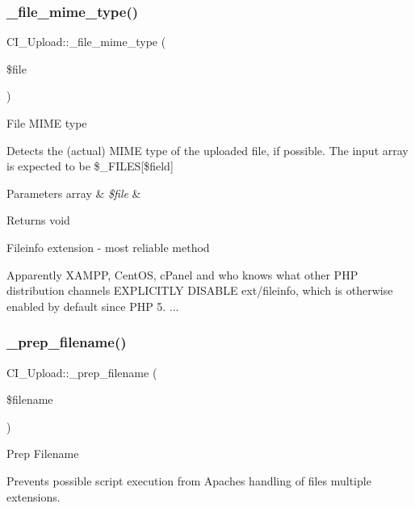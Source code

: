 \subsubsection{\texorpdfstring{\+\_\+file\+\_\+mime\+\_\+type()}{\_file\_mime\_type()}}
{\footnotesize\ttfamily C\+I\+\_\+\+Upload\+::\+\_\+file\+\_\+mime\+\_\+type (\begin{DoxyParamCaption}\item[{}]{\$file }\end{DoxyParamCaption})\hspace{0.3cm}{\ttfamily [protected]}}

File M\+I\+ME type

Detects the (actual) M\+I\+ME type of the uploaded file, if possible. The input array is expected to be \$\+\_\+\+F\+I\+L\+ES\mbox{[}\$field\mbox{]}


\begin{DoxyParams}[1]{Parameters}
array & {\em \$file} & \\
\hline
\end{DoxyParams}
\begin{DoxyReturn}{Returns}
void 
\end{DoxyReturn}
Fileinfo extension -\/ most reliable method

Apparently X\+A\+M\+PP, Cent\+OS, c\+Panel and who knows what other P\+HP distribution channels E\+X\+P\+L\+I\+C\+I\+T\+LY D\+I\+S\+A\+B\+LE ext/fileinfo, which is otherwise enabled by default since P\+HP 5. ...\mbox{\label{class_c_i___upload_a9392dbfb099708e0867a08baeb108ec0}} 
\subsubsection{\texorpdfstring{\+\_\+prep\+\_\+filename()}{\_prep\_filename()}}
{\footnotesize\ttfamily C\+I\+\_\+\+Upload\+::\+\_\+prep\+\_\+filename (\begin{DoxyParamCaption}\item[{}]{\$filename }\end{DoxyParamCaption})\hspace{0.3cm}{\ttfamily [protected]}}

Prep Filename

Prevents possible script execution from Apache\textquotesingle{}s handling of files\textquotesingle{} multiple extensions.

